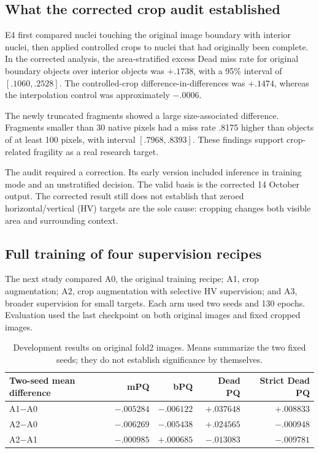 \documentclass[11pt,a4paper]{article}
\begin{document}
\subsection{What the corrected crop audit established}

E4 first compared nuclei touching the original image boundary with interior nuclei, then applied controlled crops to nuclei that had originally been complete. In the corrected analysis, the area-stratified excess Dead miss rate for original boundary objects over interior objects was $+.1738$, with a 95\% interval of $[.1060,.2528]$. The controlled-crop difference-in-differences was $+.1474$, whereas the interpolation control was approximately $-.0006$.

The newly truncated fragments showed a large size-associated difference. Fragments smaller than 30 native pixels had a miss rate .8175 higher than objects of at least 100 pixels, with interval $[.7968,.8393]$. These findings support crop-related fragility as a real research target.

The audit required a correction. Its early version included inference in training mode and an unstratified decision. The valid basis is the corrected 14 October output. The corrected result still does not establish that zeroed horizontal/vertical (HV) targets are the sole cause: cropping changes both visible area and surrounding context.

\subsection{Full training of four supervision recipes}

The next study compared A0, the original training recipe; A1, crop augmentation; A2, crop augmentation with selective HV supervision; and A3, broader supervision for small targets. Each arm used two seeds and 130 epochs. Evaluation used the last checkpoint on both original images and fixed cropped images.

\begin{table}[H]\centering\small
\begin{tabular}{lrrrr}\toprule
Two-seed mean difference & mPQ & bPQ & Dead PQ & Strict Dead PQ\\\midrule
A1$-$A0 & $-.005284$ & $-.006122$ & $+.037648$ & $+.008833$\\
A2$-$A0 & $-.006269$ & $-.005438$ & $+.024565$ & $-.000948$\\
A2$-$A1 & $-.000985$ & $+.000685$ & $-.013083$ & $-.009781$\\\bottomrule
\end{tabular}
\caption{Development results on original fold2 images. Means summarize the two fixed seeds; they do not establish significance by themselves.}
\end{table}
\end{document}
